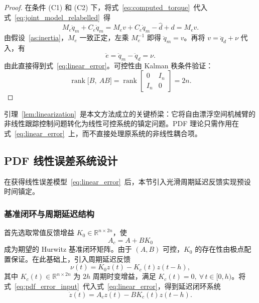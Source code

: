 \begin{proof}
  在条件 (C1) 和 (C2) 下，将式~\eqref{eq:computed_torque}~代入式~\eqref{eq:joint_model_relabelled}~得
  \[
  M_e\ddot q_m + C_e\dot q_m = M_e v + C_e\dot q_m - \hat d + d = M_e v.
  \]
  由假设~\ref{as:inertia}，\(M_e\) 一致正定，左乘 \(M_e^{-1}\) 即得 \(\ddot q_m = v\)。再将 \(v = \ddot q_d + \nu\) 代入，有
  \[
  \ddot e = \ddot q_m - \ddot q_d = \nu.
  \]
  由此直接得到式~\eqref{eq:linear_error}。可控性由 Kalman 秩条件验证：
  \[
  \operatorname{rank}\bigl[B,\ AB\bigr] 
  = \operatorname{rank}\begin{bmatrix}0 & I_n \\ I_n & 0\end{bmatrix}
  = 2n.
  \]
\end{proof}

引理~\ref{lem:linearization}~是本文方法成立的关键桥梁：它将自由漂浮空间机械臂的非线性跟踪控制问题转化为线性可控系统的镇定问题。PDF 理论只需作用在式~\eqref{eq:linear_error}~上，而不直接处理原系统的非线性耦合项。

\subsection{PDF 线性误差系统设计}
\label{sec:pdf_design}

在获得线性误差模型~\eqref{eq:linear_error}~后，本节引入光滑周期延迟反馈实现预设时间镇定。

\subsubsection{基准闭环与周期延迟结构}

首先选取常值反馈增益 \(K_0\in\mathbb R^{n\times2n}\)，使
\begin{equation}
A_c = A + BK_0
\label{eq:ac_matrix}
\end{equation}
成为期望的 Hurwitz 基准闭环矩阵。由于 \((A,B)\) 可控，\(K_0\) 的存在性由极点配置保证。在此基础上，引入周期延迟反馈
\begin{equation}
\nu(t) = K_0 z(t) - K_c(t)z(t-h),
\label{eq:pdf_error_input}
\end{equation}
其中 \(K_c(t)\in\mathbb R^{n\times2n}\) 为 \(2h\) 周期时变增益，满足 \(K_c(t)=0,\ \forall\,t\in[0,h)\)。将式~\eqref{eq:pdf_error_input}~代入式~\eqref{eq:linear_error}，得到延迟闭环系统
\begin{equation}
\dot z(t) = A_c z(t) - BK_c(t)z(t-h).
\label{eq:closed_delay_error}
\end{equation}

